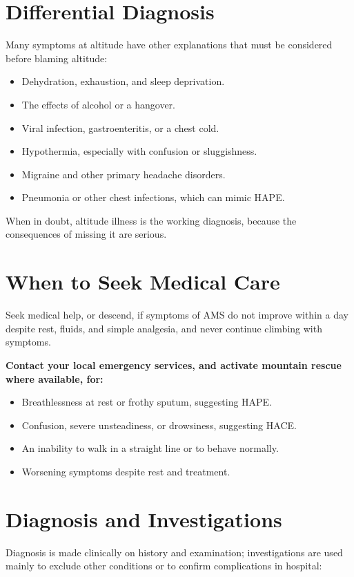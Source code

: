 \section*{Differential Diagnosis}
Many symptoms at altitude have other explanations that must be considered before blaming altitude:

\begin{itemize}
    \item Dehydration, exhaustion, and sleep deprivation.
    \item The effects of alcohol or a hangover.
    \item Viral infection, gastroenteritis, or a chest cold.
    \item Hypothermia, especially with confusion or sluggishness.
    \item Migraine and other primary headache disorders.
    \item Pneumonia or other chest infections, which can mimic HAPE.
\end{itemize}

When in doubt, altitude illness is the working diagnosis, because the consequences of missing it are serious.

\section*{When to Seek Medical Care}
Seek medical help, or descend, if symptoms of AMS do not improve within a day despite rest, fluids, and simple analgesia, and never continue climbing with symptoms.

\textbf{Contact your local emergency services, and activate mountain rescue where available, for:}
\begin{itemize}
    \item Breathlessness at rest or frothy sputum, suggesting HAPE.
    \item Confusion, severe unsteadiness, or drowsiness, suggesting HACE.
    \item An inability to walk in a straight line or to behave normally.
    \item Worsening symptoms despite rest and treatment.
\end{itemize}

\section*{Diagnosis and Investigations}
Diagnosis is made clinically on history and examination; investigations are used mainly to exclude other conditions or to confirm complications in hospital:

